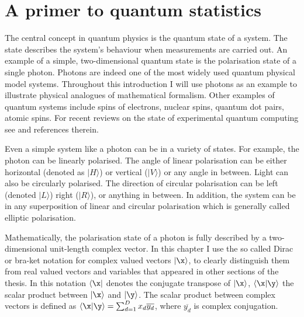 
\section{A primer to quantum statistics}

The central concept in quantum physics is the quantum state of a system. The state describes the system's behaviour when measurements are carried out. An example of a simple, two-dimensional quantum state is the polarisation state of a single photon. Photons are indeed one of the most widely used quantum physical model systems. Throughout this introduction I will use photons as an example to illustrate physical analogues of mathematical formalism. Other examples of quantum systems include spins of electrons, nuclear spins, quantum dot pairs, atomic spins. For recent reviews on the state of experimental quantum computing see \citep{Ladd2010} and references therein.

Even a simple system like a photon can be in a variety of states. For example, the photon can be linearly polarised. The angle of linear polarisation can be either horizontal (denoted as $\vert H\rangle$) or vertical ($\vert V \rangle$) or any angle in between. Light can also be circularly		 polarised. The direction of circular polarisation can be left (denoted $\vert L\rangle$) right ($\vert R\rangle$), or anything in between. In addition, the system can be in any superposition of linear and circular polarisation which is generally called elliptic polarisation.

Mathematically, the polarisation state of a photon is fully described by a two-dimensional unit-length complex vector. In this chapter I use the so called Dirac or bra-ket notation \citep{Dirac1939} for complex valued vectors $\vert\x\rangle$, to clearly distinguish them from real valued vectors and variables that appeared in other sections of the thesis. In this notation $\langle\x\vert$ denotes the conjugate transpose of $\vert\x\rangle$, $\langle\x\vert\y\rangle$ the scalar product between $\vert\x\rangle$ and $\vert\y\rangle$. The scalar product between complex vectors is defined as $\langle\x\vert\y\rangle = \sum_{d=1}^{D} x_d \overline{y_d}$, where $\overline{y_d}$ is complex conjugation.

